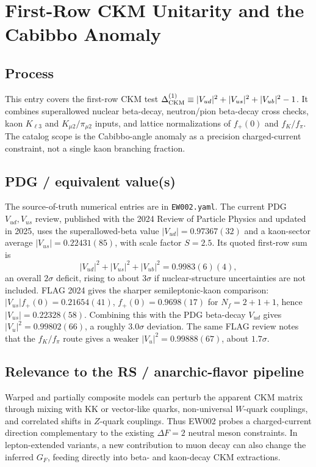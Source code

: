 
\section{\texorpdfstring{First-Row CKM Unitarity and the Cabibbo Anomaly}{First-Row CKM Unitarity and the Cabibbo Anomaly}}

\subsection*{Process}
This entry covers the first-row CKM test
\(\Delta_{\rm CKM}^{(1)}\equiv |V_{ud}|^2+|V_{us}|^2+|V_{ub}|^2-1\).
It combines superallowed nuclear beta-decay, neutron/pion beta-decay cross
checks, kaon \(K_{\ell3}\) and \(K_{\mu2}/\pi_{\mu2}\) inputs, and lattice
normalizations of \(f_+(0)\) and \(f_K/f_\pi\).  The catalog scope is the
Cabibbo-angle anomaly as a precision charged-current constraint, not a single
kaon branching fraction.

\subsection*{PDG / equivalent value(s)}
The source-of-truth numerical entries are in \texttt{EW002.yaml}.  The current
PDG \(V_{ud},V_{us}\) review, published with the 2024 Review of Particle
Physics and updated in 2025, uses the superallowed-beta value
\(|V_{ud}|=0.97367(32)\) and a kaon-sector average
\(|V_{us}|=0.22431(85)\), with scale factor \(S=2.5\).  Its quoted first-row
sum is
\[
|V_{ud}|^2+|V_{us}|^2+|V_{ub}|^2=0.9983(6)(4),
\]
an overall \(2\sigma\) deficit, rising to about \(3\sigma\) if nuclear-structure
uncertainties are not included.  FLAG 2024 gives the sharper semileptonic-kaon
comparison: \(|V_{us}|f_+(0)=0.21654(41)\), \(f_+(0)=0.9698(17)\) for
\(N_f=2+1+1\), hence \(|V_{us}|=0.22328(58)\).  Combining this with the PDG
beta-decay \(V_{ud}\) gives \(|V_u|^2=0.99802(66)\), a roughly \(3.0\sigma\)
deviation.  The same FLAG review notes that the \(f_K/f_\pi\) route gives a
weaker \(|V_u|^2=0.99888(67)\), about \(1.7\sigma\).

\subsection*{Relevance to the RS / anarchic-flavor pipeline}
Warped and partially composite models can perturb the apparent CKM matrix
through mixing with KK or vector-like quarks, non-universal \(W\)-quark
couplings, and correlated shifts in \(Z\)-quark couplings.  Thus EW002 probes a
charged-current direction complementary to the existing \(\Delta F=2\) neutral
meson constraints.  In lepton-extended variants, a new contribution to muon
decay can also change the inferred \(G_F\), feeding directly into beta- and
kaon-decay CKM extractions.

